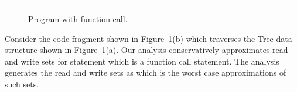  \begin{figure}[t]
  \begin{center}
  
  \end{center}
  \hrule
  \caption{\label{fig:func} Program with function call.}
\end{figure}
%
\begin{example}{\rm Consider the code fragment shown in Figure~\ref{fig:func}(b) which traverses 
the Tree data structure shown in Figure~\ref{fig:func}(a). 
Our analysis conservatively approximates read and write sets for statement  which is a function call statement. 
The analysis generates the read and write sets as  which is the worst case approximations of such sets. 
}
\hfill\psframebox{}  \end{example}

